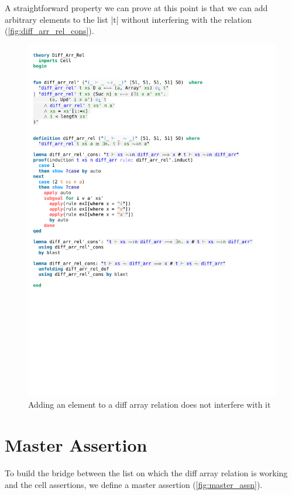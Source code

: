 \noindent A straightforward property we can prove at this point is that we can add arbitrary elements to the list |t| without interfering with the relation (\autoref{fig:diff_arr_rel_cons}).

\begin{figure}[htpb]
    \includegraphics[trim={0 11cm 0 18,2cm}, clip, width=1.00\textwidth]{figures/Theory_Diff_Arr_Rel.pdf}
    \caption[Add element to diff array relation]{Adding an element to a diff array relation does not interfere with it}
    \label{fig:diff_arr_rel_cons}
\end{figure}

\section{Master Assertion}\label{section:master_assn}

To build the bridge between the list on which the diff array relation is working and the cell assertions, we define a master assertion (\autoref{fig:master_assn}). 

